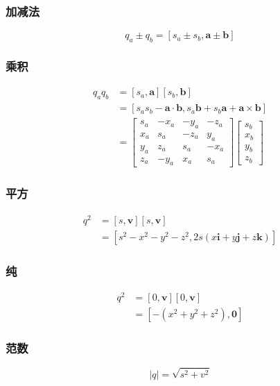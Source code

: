 \subsubsection*{加减法}
$$
q_{a} \pm q_{b}=\left[s_{a} \pm s_{b}, \mathbf{a} \pm \mathbf{b}\right]
$$

\subsubsection*{乘积}
$$
\begin{aligned}
q_{a} q_{b} & =\left[s_{a}, \mathbf{a}\right]\left[s_{b}, \mathbf{b}\right] \\
& =\left[s_{a} s_{b}-\mathbf{a} \cdot \mathbf{b}, s_{a} \mathbf{b}+s_{b} \mathbf{a}+\mathbf{a} \times \mathbf{b}\right] \\
& =\left[\begin{array}{cccc}
s_{a} & -x_{a} & -y_{a} & -z_{a} \\
x_{a} & s_{a} & -z_{a} & y_{a} \\
y_{a} & z_{a} & s_{a} & -x_{a} \\
z_{a} & -y_{a} & x_{a} & s_{a}
\end{array}\right]\left[\begin{array}{c}
s_{b} \\
x_{b} \\
y_{b} \\
z_{b}
\end{array}\right]
\end{aligned}
$$

\subsubsection*{平方}
$$
\begin{aligned}
q^{2} & =[s, \mathbf{v}][s, \mathbf{v}] \\
& =\left[s^{2}-x^{2}-y^{2}-z^{2}, 2 s(x \mathbf{i}+y \mathbf{j}+z \mathbf{k})\right]
\end{aligned}
$$

\subsubsection*{纯}
$$
\begin{aligned}
q^{2} & =[0, \mathbf{v}][0, \mathbf{v}] \\
& =\left[-\left(x^{2}+y^{2}+z^{2}\right), \mathbf{0}\right]
\end{aligned}
$$

\subsubsection*{范数}
$$
|q|=\sqrt{s^{2}+v^{2}}
$$

